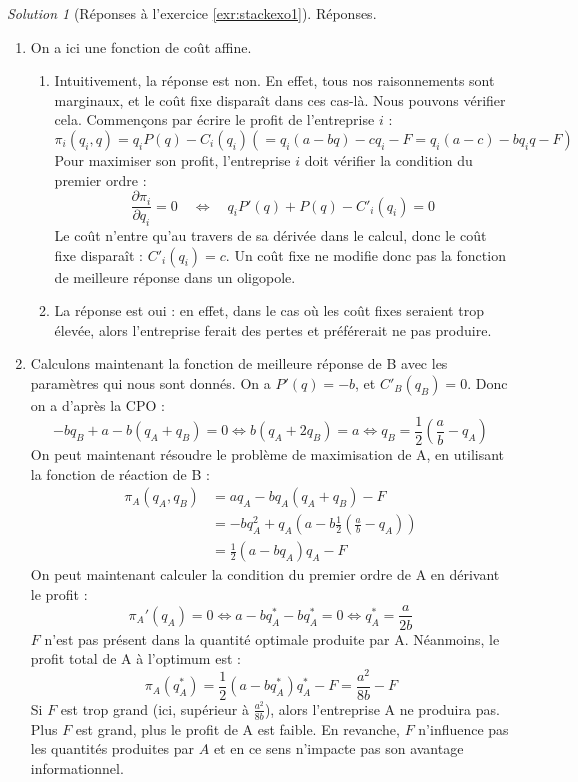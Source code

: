 \documentclass[
]{book}
\providecommand{\tightlist}{%
  \setlength{\itemsep}{0pt}\setlength{\parskip}{0pt}}
\theoremstyle{definition}
\theoremstyle{definition}
\theoremstyle{definition}
\theoremstyle{definition}
\theoremstyle{remark}
\newtheorem*{solution}{Solution}
\begin{document}
\begin{solution}[Réponses à l'exercice \ref{exr:stackexo1}]

Réponses.

\begin{enumerate}
\def\labelenumi{\arabic{enumi}.}
\tightlist
\item
  On a ici une fonction de coût affine.

  \begin{enumerate}
  \def\labelenumii{\alph{enumii}.}
  \tightlist
  \item
    Intuitivement, la réponse est non.
    En effet, tous nos raisonnements sont marginaux, et le coût fixe disparaît dans ces cas-là.
    Nous pouvons vérifier cela.
    Commençons par écrire le profit de l'entreprise \(i\) :
    \[\pi_i(q_i, q)=q_iP(q)-C_i(q_i)(=q_i(a-bq)-cq_i-F=q_i(a-c)-bq_iq-F)\]
    Pour maximiser son profit, l'entreprise \(i\) doit vérifier la condition du premier ordre :
    \[\frac{\partial\pi_i}{\partial q_i}=0\quad \Leftrightarrow \quad q_iP'(q)+P(q)-C'_i(q_i)=0\]
    Le coût n'entre qu'au travers de sa dérivée dans le calcul, donc le coût fixe disparaît : \(C'_i(q_i)=c\).
    Un coût fixe ne modifie donc pas la fonction de meilleure réponse dans un oligopole.
  \item
    La réponse est oui : en effet, dans le cas où les coût fixes seraient trop élevée, alors l'entreprise ferait des pertes et préférerait ne pas produire.
  \end{enumerate}
\item
  Calculons maintenant la fonction de meilleure réponse de B avec les paramètres qui nous sont donnés.
  On a \(P'(q)=-b\), et \(C'_B(q_B)=0\).
  Donc on a d'après la CPO :
  \[-bq_B+a-b(q_A+q_B)=0\Leftrightarrow b(q_A+2q_B)=a\Leftrightarrow q_B=\frac{1}{2}\left(\frac{a}{b}-q_A\right)\]
  On peut maintenant résoudre le problème de maximisation de A, en utilisant la fonction de réaction de B :
  \begin{align*}
  \pi_A(q_A, q_B)&=aq_A-bq_A(q_A+q_B)-F\\
  &=-bq_A^2+q_A\left(a-b\frac{1}{2}\left(\frac{a}{b}-q_A\right)\right)\\
  &=\frac{1}{2}(a-bq_A)q_A-F
  \end{align*}
  On peut maintenant calculer la condition du premier ordre de A en dérivant le profit :
  \[\pi_A'(q_A)=0 \Leftrightarrow  a-bq_A^*-bq_A^*=0\Leftrightarrow q_A^*=\frac{a}{2b}\]
  \(F\) n'est pas présent dans la quantité optimale produite par A.
  Néanmoins, le profit total de A à l'optimum est :
  \[\pi_A(q_A^*)=\frac{1}{2}(a-bq_A^*)q_A^*-F=\frac{a^2}{8b}-F\]
  Si \(F\) est trop grand (ici, supérieur à \(\frac{a^2}{8b}\)), alors l'entreprise A ne produira pas.
  Plus \(F\) est grand, plus le profit de A est faible.
  En revanche, \(F\) n'influence pas les quantités produites par \(A\) et en ce sens n'impacte pas son avantage informationnel.
\end{enumerate}

\end{solution}
\end{document}
